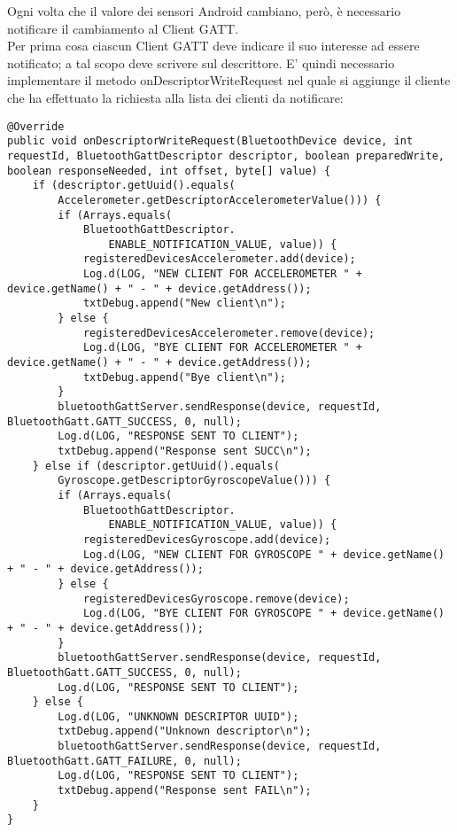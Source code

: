 \documentclass{article}
\begin{document}
Ogni volta che il valore dei sensori Android cambiano, però, è necessario notificare il cambiamento al Client GATT.\\
Per prima cosa ciascun Client GATT deve indicare il suo interesse ad essere notificato; a tal scopo deve scrivere sul descrittore. E' quindi necessario implementare il metodo onDescriptorWriteRequest nel quale si aggiunge il cliente che ha effettuato la richiesta alla lista dei clienti da notificare:
\begin{lstlisting}
@Override
public void onDescriptorWriteRequest(BluetoothDevice device, int requestId, BluetoothGattDescriptor descriptor, boolean preparedWrite, boolean responseNeeded, int offset, byte[] value) {
    if (descriptor.getUuid().equals(
        Accelerometer.getDescriptorAccelerometerValue())) {
        if (Arrays.equals(
            BluetoothGattDescriptor.
                ENABLE_NOTIFICATION_VALUE, value)) {
            registeredDevicesAccelerometer.add(device);
            Log.d(LOG, "NEW CLIENT FOR ACCELEROMETER " + device.getName() + " - " + device.getAddress());
            txtDebug.append("New client\n");
        } else {
            registeredDevicesAccelerometer.remove(device);
            Log.d(LOG, "BYE CLIENT FOR ACCELEROMETER " + device.getName() + " - " + device.getAddress());
            txtDebug.append("Bye client\n");
        }
        bluetoothGattServer.sendResponse(device, requestId, BluetoothGatt.GATT_SUCCESS, 0, null);
        Log.d(LOG, "RESPONSE SENT TO CLIENT");
        txtDebug.append("Response sent SUCC\n");
    } else if (descriptor.getUuid().equals(
        Gyroscope.getDescriptorGyroscopeValue())) {
        if (Arrays.equals(
            BluetoothGattDescriptor.
                ENABLE_NOTIFICATION_VALUE, value)) {
            registeredDevicesGyroscope.add(device);
            Log.d(LOG, "NEW CLIENT FOR GYROSCOPE " + device.getName() + " - " + device.getAddress());
        } else {
            registeredDevicesGyroscope.remove(device);
            Log.d(LOG, "BYE CLIENT FOR GYROSCOPE " + device.getName() + " - " + device.getAddress());
        }
        bluetoothGattServer.sendResponse(device, requestId, BluetoothGatt.GATT_SUCCESS, 0, null);
        Log.d(LOG, "RESPONSE SENT TO CLIENT");
    } else {
        Log.d(LOG, "UNKNOWN DESCRIPTOR UUID");
        txtDebug.append("Unknown descriptor\n");
        bluetoothGattServer.sendResponse(device, requestId, BluetoothGatt.GATT_FAILURE, 0, null);
        Log.d(LOG, "RESPONSE SENT TO CLIENT");
        txtDebug.append("Response sent FAIL\n");
    }
}
\end{lstlisting}
\end{document}
